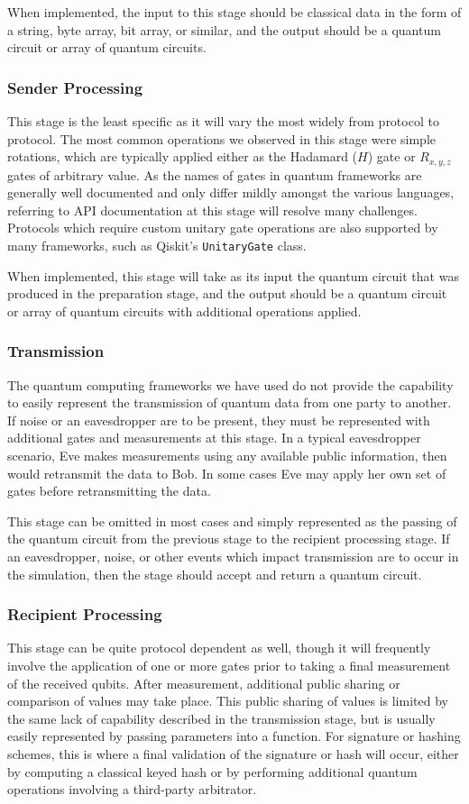 \documentclass[sigconf]{acmart}
\begin{document}
When implemented, the input to this stage should be classical data in the form of a string, byte array, bit array, or similar, and the output should be a quantum circuit or array of quantum circuits.

\subsubsection{Sender Processing}
This stage is the least specific as it will vary the most widely from protocol to protocol. The most common operations we observed in this stage were simple rotations, which are typically applied either as the Hadamard ($H$) gate or $R_{x,y,z}$ gates of arbitrary value. As the names of gates in quantum frameworks are generally well documented and only differ mildly amongst the various languages, referring to API documentation at this stage will resolve many challenges. Protocols which require custom unitary gate operations are also supported by many frameworks, such as Qiskit's \texttt{UnitaryGate} class.

When implemented, this stage will take as its input the quantum circuit that was produced in the preparation stage, and the output should be a quantum circuit or array of quantum circuits with additional operations applied.

\subsubsection{Transmission}
The quantum computing frameworks we have used do not provide the capability to easily represent the transmission of quantum data from one party to another. If noise or an eavesdropper are to be present, they must be represented with additional gates and measurements at this stage. In a typical eavesdropper scenario, Eve makes measurements using any available public information, then would retransmit the data to Bob. In some cases Eve may apply her own set of gates before retransmitting the data.

This stage can be omitted in most cases and simply represented as the passing of the quantum circuit from the previous stage to the recipient processing stage. If an eavesdropper, noise, or other events which impact transmission are to occur in the simulation, then the stage should accept and return a quantum circuit.

\subsubsection{Recipient Processing}
This stage can be quite protocol dependent as well, though it will frequently involve the application of one or more gates prior to taking a final measurement of the received qubits. After measurement, additional public sharing or comparison of values may take place. This public sharing of values is limited by the same lack of capability described in the transmission stage, but is usually easily represented by passing parameters into a function. For signature or hashing schemes, this is where a final validation of the signature or hash will occur, either by computing a classical keyed hash or by performing additional quantum operations involving a third-party arbitrator.
\end{document}
